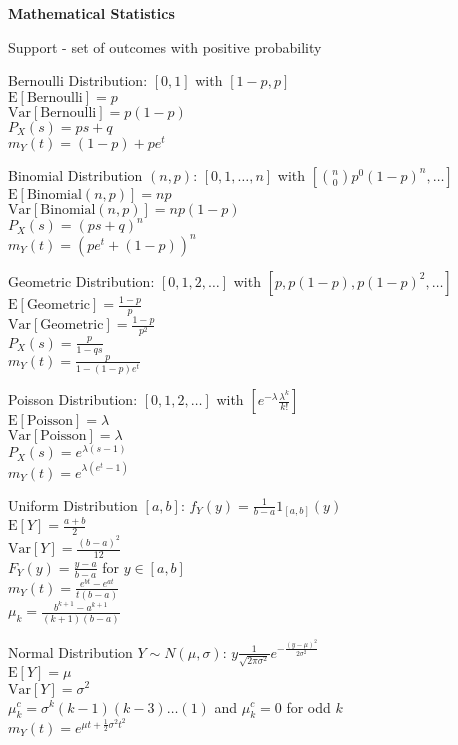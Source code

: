 \Large
\twocolumn

\textbf{Mathematical Statistics}

Support - set of outcomes with positive probability

Bernoulli Distribution: $[0,1]$ with $[1-p,p]$ \\
$\text{E}[\text{Bernoulli}]=p$ \\
$\text{Var}[\text{Bernoulli}]=p(1-p)$ \\
$P_X(s)=ps+q$ \\
$m_Y(t)=(1-p)+pe^t$

Binomial Distribution $(n,p)$: $[0,1,\dots,n]$ with $[\binom{n}{0}p^0(1-p)^n,\dots]$ \\
$\text{E}[\text{Binomial}(n,p)]=np$ \\
$\text{Var}[\text{Binomial}(n,p)]=np(1-p)$ \\
$P_X(s)=(ps+q)^n$ \\
$m_Y(t)=(pe^t+(1-p))^n$

Geometric Distribution: $[0,1,2,\dots]$ with $[p,p(1-p),p(1-p)^2,\dots]$ \\
$\text{E}[\text{Geometric}]=\frac{1-p}{p}$ \\
$\text{Var}[\text{Geometric}]=\frac{1-p}{p^2}$ \\
$P_X(s)=\frac{p}{1-qs}$ \\
$m_Y(t)=\frac{p}{1-(1-p)e^t}$

Poisson Distribution: $[0,1,2,\dots]$ with $[e^{-\lambda}\frac{\lambda^k}{k!}]$ \\
$\text{E}[\text{Poisson}]=\lambda$ \\
$\text{Var}[\text{Poisson}]=\lambda$ \\
$P_X(s)=e^{\lambda(s-1)}$ \\
$m_Y(t)=e^{\lambda (e^t-1)}$

Uniform Distribution $[a,b]$: $f_Y(y)=\frac{1}{b-a}1_{[a,b]}(y)$ \\
$\text{E}[Y]=\frac{a+b}{2}$ \\
$\text{Var}[Y]=\frac{(b-a)^2}{12}$ \\
$F_Y(y)=\frac{y-a}{b-a}$ for $y\in [a,b]$ \\
$m_Y(t)=\frac{e^{bt}-e^{at}}{t(b-a)}$ \\
$\mu_k=\frac{b^{k+1}-a^{k+1}}{(k+1)(b-a)}$

Normal Distribution $Y\sim N(\mu,\sigma)$: $y\frac{1}{\sqrt{2\pi\sigma^2}}e^{-\frac{(y-\mu)^2}{2\sigma^2}}$ \\
$\text{E}[Y]=\mu$ \\
$\text{Var}[Y]=\sigma^2$ \\
$\mu_k^c=\sigma^k(k-1)(k-3)\dots(1)$ and $\mu_k^c=0$ for odd $k$ \\
$m_Y(t)=e^{\mu t+ \frac{1}{2} \sigma^2 t^2}$ 

